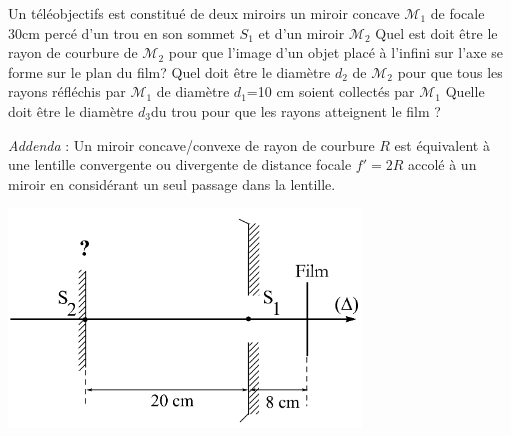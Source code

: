 \begin{Exercise}[title=Téleobjectif à deux miroirs]
Un téléobjectifs est constitué de deux miroirs un miroir concave $\mathcal{M}_1$ de focale 30cm percé d'un trou en son sommet $S_1$ et d'un miroir $\mathcal{M}_2$
\Question Quel est doit être le rayon de courbure de $\mathcal{M_2}$ pour que l'image d'un objet placé à l'infini sur l'axe se forme sur  le plan du film?
\Question Quel doit être le diamètre $d_2$ de $\mathcal{M}_2$ pour que tous les rayons réfléchis par $\mathcal{M}_1$ de diamètre $d_1$=10 cm soient collectés par $\mathcal{M}_1$
\Question Quelle doit être le diamètre $d_3$du trou pour que les rayons atteignent le film ?

\emph{Addenda} : Un miroir concave/convexe de rayon de courbure $R$ est
équivalent à une lentille convergente ou divergente de distance focale $f'= 2R$
accolé à un miroir en considérant un seul passage dans la lentille.

\begin{center}
	\includegraphics[scale=0.8]{./fig/teleob_vide.png}
\end{center}
\end{Exercise}

